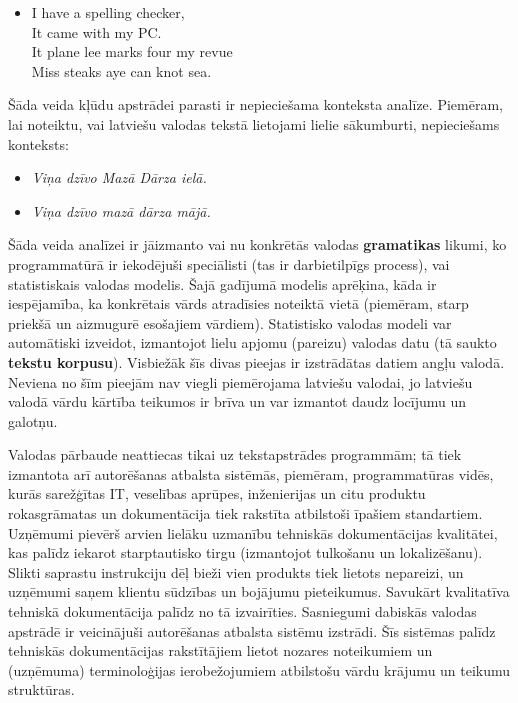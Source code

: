 \begin{multicols}{2}
\begin{itemize}
\item[] I have a spelling checker,\\
  It came with my PC.\\
  It plane lee marks four my revue\\
  Miss steaks aye can knot sea.
\end{itemize}

Šāda veida kļūdu apstrādei parasti ir nepieciešama konteksta analīze.
Piemēram, lai noteiktu, vai latviešu valodas tekstā lietojami lielie sākumburti, nepieciešams konteksts:

\begin{itemize}
\item \textit{Viņa dzīvo Mazā Dārza ielā.}
\item \textit{Viņa dzīvo mazā dārza mājā.}
\end{itemize}

Šāda veida analīzei ir jāizmanto vai nu konkrētās valodas \textbf{gramatikas} likumi, ko programmatūrā ir iekodējuši speciālisti (tas ir darbietilpīgs process), vai statistiskais valodas modelis. 
Šajā gadījumā modelis aprēķina, kāda ir iespējamība, ka konkrētais vārds atradīsies noteiktā vietā (piemēram, starp priekšā un aizmugurē esošajiem vārdiem).
Statistisko valodas modeli var automātiski izveidot, izmantojot lielu apjomu (pareizu) valodas datu (tā saukto \textbf{tekstu korpusu}).
Visbiežāk šīs divas pieejas ir izstrādātas datiem angļu valodā.
Neviena no šīm pieejām nav viegli piemērojama latviešu valodai, jo latviešu valodā vārdu kārtība teikumos ir brīva un var izmantot daudz locījumu un galotņu. 


Valodas pārbaude neattiecas tikai uz tekstapstrādes programmām; tā tiek izmantota arī autorēšanas \mbox{atbalsta} sistēmās, piemēram, programmatūras vidēs, kurās sarežģītas IT, veselības aprūpes, inženierijas un citu produktu rokasgrāmatas un dokumentācija tiek rakstīta atbilstoši īpašiem standartiem.
Uzņēmumi pievērš arvien lielāku uzmanību tehniskās dokumentācijas kvalitātei, kas palīdz iekarot starptautisko tirgu (izmantojot tulkošanu un lokalizēšanu).
Slikti saprastu instrukciju dēļ bieži vien produkts tiek lietots nepareizi, un uzņēmumi saņem klientu sūdzības un bojājumu \mbox{pieteikumus}.
\mbox{Savukārt} kvalitatīva tehniskā dokumentācija palīdz no tā izvairīties.
Sasniegumi dabiskās valodas apstrādē ir veicinājuši autorēšanas atbalsta sistēmu izstrādi.
Šīs sistēmas palīdz tehniskās dokumentācijas rakstītājiem lietot nozares noteikumiem un (uzņēmuma) terminoloģijas ierobežojumiem atbilstošu vārdu krājumu un teikumu struktūras.


\end{multicols}
